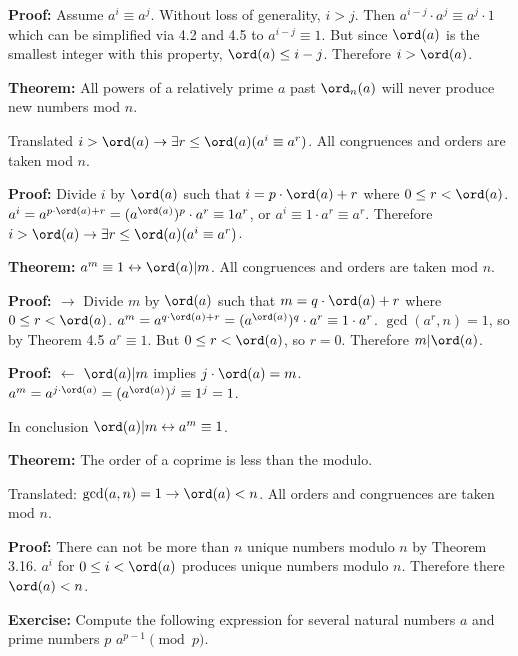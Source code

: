 \textbf{Proof:} Assume \(a^i \equiv a^j\). Without loss of generality, \(i > j\). Then \(a^{i-j} \cdot a^j \equiv a^j \cdot 1\) which can be simplified via 4.2 and 4.5 to \(a^{i-j} \equiv 1\). But since \(\ord(a)\) is the smallest integer with this property,  \(\ord(a) \leq i - j\). Therefore \(i > \ord(a)\). \qedhere

\item \textbf{Theorem:} All powers of a relatively prime \(a\) past \(\ord_n(a)\) will never produce new numbers mod \(n\).

Translated \(i > \ord(a) \rightarrow \exists r \leq \ord(a) (a^i \equiv a^r)\). All congruences and orders are taken mod \(n\).

\textbf{Proof:} Divide \(i\) by \(\ord(a)\) such that \(i = p \cdot \ord(a) + r\) where \(0 \leq r < \ord(a)\). \(a^i = a^{p \cdot \ord(a) + r} = (a^{\ord(a)})^p \cdot a^r \equiv 1 a^r\), or \(a^i \equiv 1 \cdot a^r \equiv a^r\). Therefore \(i > \ord(a) \rightarrow \exists r \leq \ord(a) (a^i \equiv a^r)\). \qedhere

\item \textbf{Theorem:} \(a^m \equiv 1 \leftrightarrow \ord(a)|m\). All congruences and orders are taken mod \(n\).

\textbf{Proof: \(\rightarrow\)} Divide \(m\) by \(\ord(a)\) such that \(m = q \cdot \ord(a) + r\) where \(0 \leq r < \ord(a)\). \(a^m = a^{q \cdot \ord(a) + r} = (a^{\ord(a)})^q \cdot a^r \equiv 1 \cdot a^r\). \(\gcd(a^r, n) = 1\), so by Theorem 4.5 \(a^r \equiv 1\). But \(0 \leq r < \ord(a)\), so \(r = 0\). Therefore \(m|\ord(a)\).

\textbf{Proof: \(\leftarrow\)} \(\ord(a)|m\) implies \(j \cdot \ord(a) = m\). \(a^m = a^{j \cdot \ord(a)} = (a^{\ord(a)})^j \equiv 1^j = 1\).

In conclusion \(\ord(a)|m \leftrightarrow a^m \equiv 1\). \qedhere

\item \textbf{Theorem:} The order of a coprime is less than the modulo.

Translated: \(\gcd(a, n) = 1 \rightarrow \ord(a) < n\). All orders and congruences are taken mod \(n\).

\textbf{Proof:} There can not be more than \(n\) unique numbers modulo \(n\) by Theorem 3.16. \(a^i\) for \(0 \leq i < \ord(a)\) produces unique numbers modulo \(n\). Therefore there \(\ord(a) < n\). \qedhere

\item \textbf{Exercise:} Compute the following expression for several natural numbers \(a\) and prime numbers \(p\) \(a^{p-1} \pmod p\).

